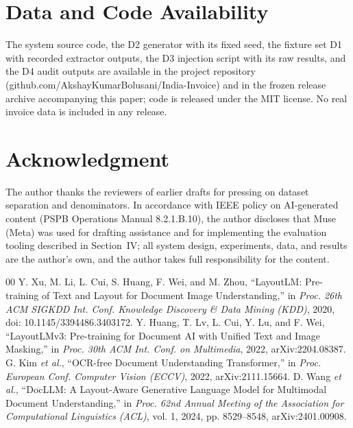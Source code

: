 \documentclass[conference]{IEEEtran}
\begin{document}
\section*{Data and Code Availability}
The system source code, the D2 generator with its fixed seed, the fixture set D1 with recorded extractor outputs, the D3 injection script with its raw results, and the D4 audit outputs are available in the project repository (github.com/AkshayKumarBolusani/India-Invoice) and in the frozen release archive accompanying this paper; code is released under the MIT license. No real invoice data is included in any release.

\section*{Acknowledgment}
The author thanks the reviewers of earlier drafts for pressing on dataset separation and denominators. In accordance with IEEE policy on AI-generated content (PSPB Operations Manual 8.2.1.B.10), the author discloses that Muse (Meta) was used for drafting assistance and for implementing the evaluation tooling described in Section~IV; all system design, experiments, data, and results are the author's own, and the author takes full responsibility for the content.

\begin{thebibliography}{00}
 Y. Xu, M. Li, L. Cui, S. Huang, F. Wei, and M. Zhou, ``LayoutLM: Pre-training of Text and Layout for Document Image Understanding,'' in \emph{Proc. 26th ACM SIGKDD Int. Conf. Knowledge Discovery \& Data Mining (KDD)}, 2020, doi: 10.1145/3394486.3403172.
 Y. Huang, T. Lv, L. Cui, Y. Lu, and F. Wei, ``LayoutLMv3: Pre-training for Document AI with Unified Text and Image Masking,'' in \emph{Proc. 30th ACM Int. Conf. on Multimedia}, 2022, arXiv:2204.08387.
 G. Kim \emph{et al.}, ``OCR-free Document Understanding Transformer,'' in \emph{Proc. European Conf. Computer Vision (ECCV)}, 2022, arXiv:2111.15664.
 D. Wang \emph{et al.}, ``DocLLM: A Layout-Aware Generative Language Model for Multimodal Document Understanding,'' in \emph{Proc. 62nd Annual Meeting of the Association for Computational Linguistics (ACL)}, vol. 1, 2024, pp. 8529--8548, arXiv:2401.00908.
\end{thebibliography}
\end{document}
